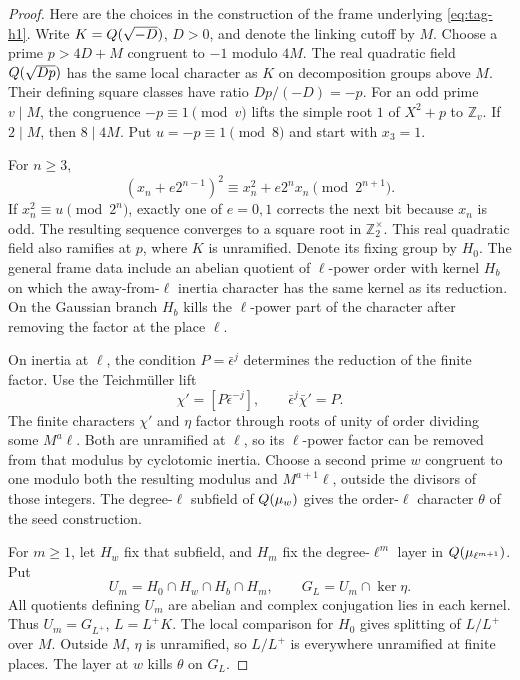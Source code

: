 \begin{proof}
Here are the choices in the construction of the frame underlying
\eqref{eq:tag-h1}. Write \(K=Q(\sqrt{-D})\), \(D>0\), and denote the linking
cutoff by \(M\). Choose a prime \(p>4D+M\) congruent to \(-1\)
modulo \(4M\). The real quadratic field
\(Q(\sqrt{Dp})\) has the same local character as \(K\) on
decomposition groups above \(M\). Their defining square classes have ratio \(Dp/(-D)=-p\). For an odd prime \(v\mid M\), the congruence \(-p\equiv1\pmod v\) lifts the simple root \(1\) of \(X^2+p\) to \(\mathbb Z_v\). If \(2\mid M\), then \(8\mid4M\). Put \(u=-p\equiv1\pmod8\) and start with \(x_3=1\).

For \(n\ge3\),
\[
 (x_n+e2^{n-1})^2\equiv x_n^2+e2^n x_n\pmod {2^{n+1}} .
\]
If \(x_n^2\equiv u\pmod {2^n}\), exactly one of \(e=0,1\) corrects the next bit because \(x_n\) is odd. The resulting sequence converges to a square root in \(\mathbb Z_2^\times\).
This real quadratic field also ramifies at \(p\), where \(K\)
is unramified. Denote its fixing group by \(H_0\). The general
frame data include an abelian quotient of \(\ell\)-power order
with kernel \(H_b\) on which the away-from-\(\ell\) inertia
character has the same kernel as its reduction. On the Gaussian
branch \(H_b\) kills the \(\ell\)-power part of the character
after removing the factor at the place \(\ell\).

On inertia at \(\ell\), the condition \(P=\bar\epsilon^j\) determines the reduction of the finite factor. Use the Teichm\"uller lift
\[
 \chi'=[P\bar\epsilon^{-j}],\qquad\bar\epsilon^j\bar\chi'=P .
\]
The finite characters \(\chi'\) and \(\eta\) factor through
roots of unity of order dividing some \(M^a\ell\). Both are
unramified at \(\ell\), so its \(\ell\)-power factor can be
removed from that modulus by cyclotomic inertia. Choose a
second prime \(w\) congruent to one modulo both the resulting
modulus and \(M^{a+1}\ell\), outside the divisors of those
integers. The degree-\(\ell\) subfield of \(Q(\mu_w)\) gives
the order-\(\ell\) character \(\theta\) of the seed construction.

For \(m\ge1\), let \(H_w\) fix that subfield, and \(H_m\) fix the
degree-\(\ell^m\) layer in \(Q(\mu_{\ell^{m+1}})\). Put
\[
       U_m=H_0\cap H_w\cap H_b\cap H_m,\qquad
       G_L=U_m\cap\ker\eta .
       \tag{H2}\label{eq:tag-h2}
\]
All quotients defining \(U_m\) are abelian and complex conjugation
lies in each kernel. Thus \(U_m=G_{L^+}\), \(L=L^+K\). The
local comparison for \(H_0\) gives splitting of \(L/L^+\) over
\(M\). Outside \(M\), \(\eta\) is unramified, so \(L/L^+\) is
everywhere unramified at finite places. The layer at \(w\)
kills \(\theta\) on \(G_L\).


\end{proof}
